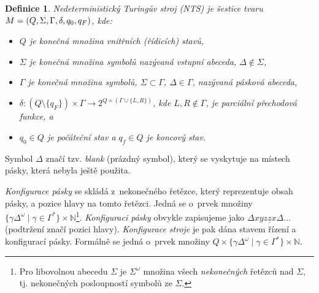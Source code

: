 \documentclass[twocolumn, 11pt, a4paper]{article}
\newtheorem{definition}{Definice}
\begin{document}
	\begin{definition}
	\emph{Nedeterministický Turingův stroj} (NTS) je šes\-ti\-ce tvaru
		$M = (\mathnormal{Q}, \Sigma, \Gamma, \delta, q_{0}, q_{F})$, kde:
		\begin{itemize}
			\item{
				$Q$ je konečná množina \textnormal{vnitřních (řídicích) stavů},
			}
			\item{
				$\Sigma$ je konečná množina symbolů nazývaná \textnormal{vstupní abeceda}, $\Delta \not\in \Sigma$,
			}
			\item{
				$\Gamma$ je konečná množina symbolů, $\Sigma \subset \Gamma$, $\Delta \in \Gamma$, nazývaná \textnormal{pásková abeceda},
			}
			\item{
				$\delta: (Q \setminus \{q_F\} ) \times \Gamma \rightarrow 2^{Q \times (\Gamma \cup \{L, R\})}$, kde $L, R \notin \Gamma$, je parciální \textnormal{přechodová funkce}, a
			}
			\item{
				$q_0 \in Q$ je \textnormal{počáteční stav} a $q_f \in Q$ je \textnormal{koncový stav}.
			}
		\end{itemize}
	\end{definition} 

	Symbol $\Delta$ značí tzv. \textit{blank} (prázdný symbol), který se vyskytuje na místech pásky, která nebyla ještě použita.

	\textit{Konfigurace pásky} se skládá z~nekonečného řetězce, který reprezentuje obsah pásky, a pozice hlavy na tomto řetězci. Jedná se o~prvek množiny
		$\{\gamma \Delta^{\omega}\;|\;\gamma \in \Gamma^*\} \times \mathbb{N}$\footnote{
		Pro libovolnou abecedu $\Sigma$ je $\Sigma^{\omega}$ množina všech \textit{nekonečných} řetězců nad $\Sigma$, tj. nekonečných posloupností symbolů ze $\Sigma$.
		}.
	\textit{Konfiguraci pásky} obvykle zapisujeme jako
		$\Delta xyz\underline{z}x\Delta $... (podtržení značí pozici hlavy).
	\textit{Konfigurace stroje} je pak dána stavem řízení a konfigurací pásky. Formálně se jedná o~prvek množiny
		$Q \times \{\gamma \Delta^{\omega}\;|\;\gamma \in \Gamma^*\} \times \mathbb{N}$.
\end{document}
